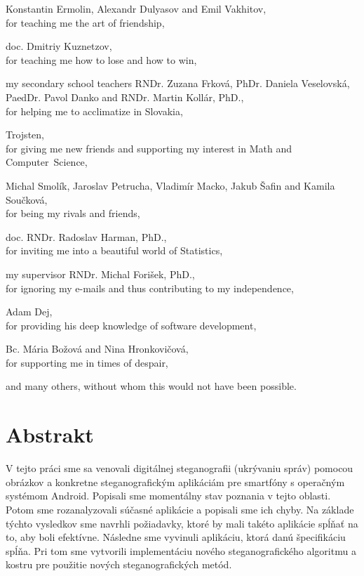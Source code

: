\documentclass[12pt, oneside]{book}
\def\ack#1#2{#1,\\#2\smallskip}
\begin{document}
\ack{Konstantin Ermolin, Alexandr Dulyasov and Emil Vakhitov}{for teaching me the art of friendship,}

\ack{doc. Dmitriy Kuznetzov}{for teaching me how to lose and how to win,}

\ack{my secondary school teachers RNDr. Zuzana Frková, PhDr. Daniela Veselovská, PaedDr. Pavol Danko and RNDr. Martin Kollár, PhD.}
{for helping me to acclimatize in Slovakia,}

\ack{Trojsten}{for giving me new friends and supporting my interest in Math and Computer~Science,}

\ack{Michal Smolík, Jaroslav Petrucha, Vladimír Macko, Jakub Šafin and Kamila Součková}{for being
my rivals and friends,}

\ack{doc. RNDr. Radoslav Harman, PhD.}{for inviting me into a beautiful world of Statistics,}

\ack{my supervisor RNDr. Michal Forišek, PhD.}{for ignoring my e-mails and thus contributing to my independence,}

\ack{Adam Dej}{for providing his deep knowledge of software development,}

\ack{Bc. Mária Božová and Nina Hronkovičová}{for supporting me in times of despair,}

and many others, without whom this would not have been possible.

\vfill


\newpage 
\section*{Abstrakt}

V tejto práci sme sa venovali digitálnej steganografii (ukrývaniu správ) pomocou obrázkov 
a konkretne steganografickým aplikáciám pre smartfóny s operačným systémom Android. 
Popisali sme momentálny stav poznania v tejto oblasti. 
Potom sme rozanalyzovali súčasné aplikácie
a popisali sme ich chyby. Na základe týchto vysledkov sme navrhli 
požiadavky, ktoré by mali takéto aplikácie spĺňať na to, aby boli efektívne. Následne
sme vyvinuli aplikáciu, ktorá danú špecifikáciu spĺňa. 
Pri tom sme vytvorili implementáciu nového steganografického algoritmu a kostru
pre použitie nových steganografických metód.
\end{document}

